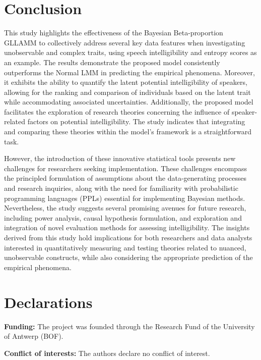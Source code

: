 \documentclass[
  authoryear,
  preprint,
  1p]{elsarticle}
\begin{document}
\section{Conclusion}\label{sec-conclusion}

This study highlights the effectiveness of the Bayesian Beta-proportion
GLLAMM to collectively address several key data features when
investigating unobservable and complex traits, using speech
intelligibility and entropy scores as an example. The results
demonstrate the proposed model consistently outperforms the Normal LMM
in predicting the empirical phenomena. Moreover, it exhibits the ability
to quantify the latent potential intelligibility of speakers, allowing
for the ranking and comparison of individuals based on the latent trait
while accommodating associated uncertainties. Additionally, the proposed
model facilitates the exploration of research theories concerning the
influence of speaker-related factors on potential intelligibility. The
study indicates that integrating and comparing these theories within the
model's framework is a straightforward task.

However, the introduction of these innovative statistical tools presents
new challenges for researchers seeking implementation. These challenges
encompass the principled formulation of assumptions about the
data-generating processes and research inquiries, along with the need
for familiarity with probabilistic programming languages (PPLs)
essential for implementing Bayesian methods. Nevertheless, the study
suggests several promising avenues for future research, including power
analysis, causal hypothesis formulation, and exploration and integration
of novel evaluation methods for assessing intelligibility. The insights
derived from this study hold implications for both researchers and data
analysts interested in quantitatively measuring and testing theories
related to nuanced, unobservable constructs, while also considering the
appropriate prediction of the empirical phenomena.

\newpage{}

\section*{Declarations}\label{declarations}

\textbf{Funding:} The project was founded through the Research Fund of
the University of Antwerp (BOF).

\textbf{Conflict of interests:} The authors declare no conflict of
interest.
\end{document}
